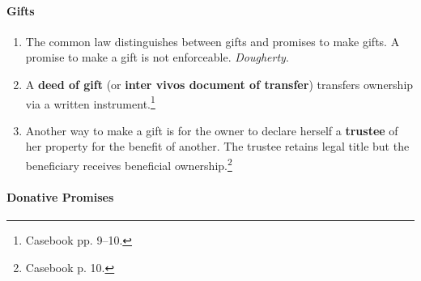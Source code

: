\paragraph{Gifts}

\begin{enumerate}
    \item The common law distinguishes between gifts and promises to make 
    gifts. A promise to make a gift is not enforceable. \emph{Dougherty}.
    \item A \textbf{deed of gift} (or \textbf{inter vivos document of 
    transfer}) transfers ownership via a written instrument.\footnote{Casebook 
    pp. 9--10.}
    \item Another way to make a gift is for the owner to declare herself a 
    \textbf{trustee} of her property for the benefit of another. The trustee 
    retains legal title but the beneficiary receives beneficial 
    ownership.\footnote{Casebook p. 10.}
\end{enumerate}

\paragraph{Donative Promises}

